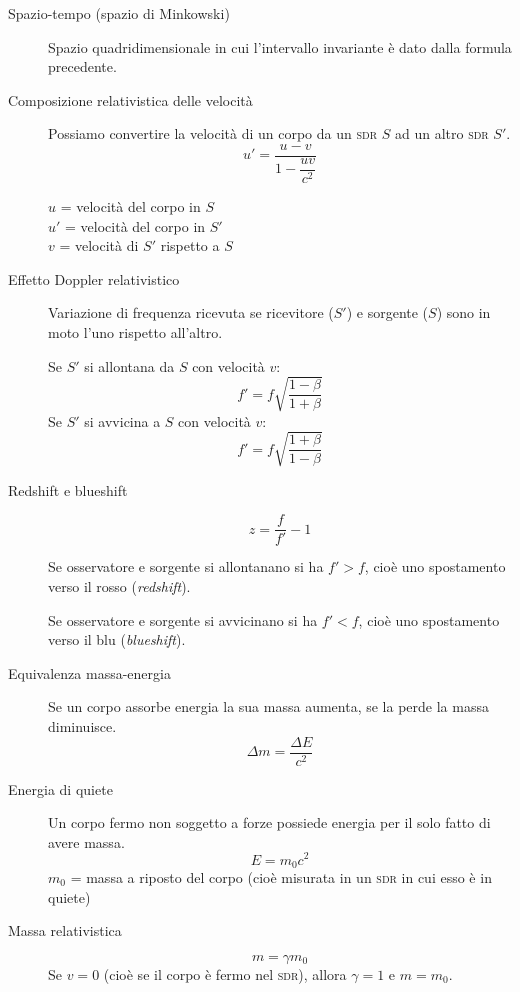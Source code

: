 \documentclass[a4paper,11pt,italian]{article}
\begin{document}
\begin{description}
  \item[Spazio-tempo (spazio di Minkowski)]
  Spazio quadridimensionale in cui l'intervallo invariante è dato dalla formula precedente.
  
  \item[Composizione relativistica delle velocità]
  Possiamo convertire la velocità di un corpo da un \textsc{sdr} $ S $ ad un altro \textsc{sdr} $ S' $.
  \[ u' = \frac{u - v}{1- \dfrac{u v}{c^2}} \]
  \begin{multicols}{2}
  $ u $ = velocità del corpo in $ S $\\
  $ u' $ = velocità del corpo in $ S' $\\
  $ v $ = velocità di $ S' $ rispetto a $ S $
  \end{multicols}
  
  \item[Effetto Doppler relativistico]
  Variazione di frequenza ricevuta se ricevitore ($ S' $) e sorgente ($ S $) sono in moto l'uno rispetto all'altro.
  \begin{multicols}{2}
  Se $ S' $ si allontana da $ S $ con velocità $ v $:
  \[ f' = f \sqrt{\frac{1 - \beta}{1 + \beta}} \]
  Se $ S' $ si avvicina a $ S $ con velocità $ v $:
  \[ f' = f \sqrt{\frac{1 + \beta}{1 - \beta}} \]
  \end{multicols}
  
  \item[Redshift e blueshift]
  \[ z = \frac{f}{f'} - 1 \]
  
  Se osservatore e sorgente si allontanano si ha $ f'>f $, cioè uno spostamento verso il rosso (\emph{redshift}).
  
  Se osservatore e sorgente si avvicinano si ha $ f'<f $, cioè uno spostamento verso il blu (\emph{blueshift}).
  
  \item[Equivalenza massa-energia] Se un corpo assorbe energia la sua massa aumenta, se la perde la massa diminuisce.
  \[ \Delta m = \frac{\Delta E}{c^2} \]
  
  \item[Energia di quiete] Un corpo fermo non soggetto a forze possiede energia per il solo fatto di avere massa.
  \[ E = m_0 c^2 \]
  $ m_0 $ = massa a riposto del corpo (cioè misurata in un \textsc{sdr} in cui esso è in quiete)
  
  \item[Massa relativistica]
  \[ m = \gamma m_0 \]
  Se $ v = 0 $ (cioè se il corpo è fermo nel \textsc{sdr}), allora $ \gamma = 1 $ e $ m=m_0 $.
  

\end{description}
\end{document}
